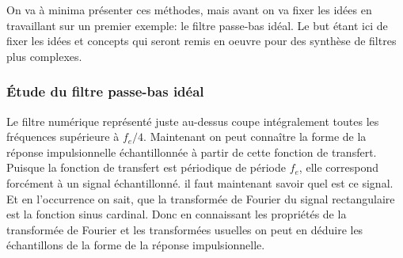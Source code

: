 \documentclass[11pt,a4paper]{article}
\begin{document}
On va à minima présenter ces méthodes, mais avant on va fixer les idées en travaillant sur un premier exemple: le filtre passe-bas idéal. Le but étant ici de fixer les idées et concepts qui seront remis en oeuvre pour des synthèse de filtres plus complexes.\\

\subsubsection{Étude du filtre passe-bas idéal}

\begin{center}
\end{center}

Le filtre numérique représenté juste au-dessus coupe intégralement toutes les fréquences supérieure à $f_e/4$. Maintenant on peut connaître la forme de la réponse impulsionnelle échantillonnée à partir de cette fonction de transfert.\\

Puisque la fonction de transfert est périodique de période $f_e$, elle correspond forcément à un signal échantillonné. il faut maintenant savoir quel est ce signal. Et en l'occurrence on sait, que la transformée de  Fourier du signal rectangulaire est la fonction sinus cardinal. Donc en connaissant les propriétés de la transformée de Fourier et les transformées usuelles on peut en déduire les échantillons de la forme de la réponse impulsionnelle.\\
\end{document}
